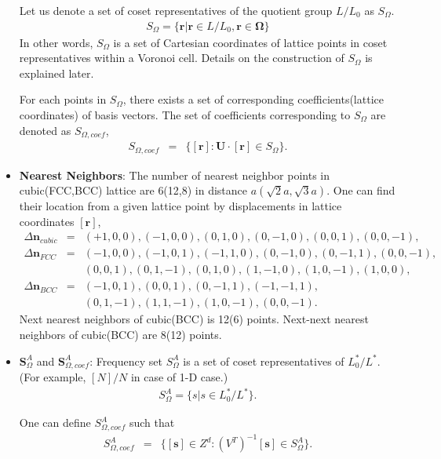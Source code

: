 \documentclass[10pt]{book}
\def\bm{\boldsymbol}
\newcommand{\bea}{\begin{eqnarray}}
\newcommand{\eea}{\end{eqnarray}}
\newcommand{\no}{\nonumber \\}
\def\vn{{\bm n}}
\begin{document}
\begin{itemize}
     Let us denote a set of coset representatives of the quotient group $L/L_0$ as $S_\Omega$.  
     \bea 
     S_\Omega  = \{ {\bm r}| {\bm r}\in L/L_0, {\bm r} \in {\bm \Omega} \}
     \eea 
     In other words, $S_\Omega$ is a set of Cartesian coordinates of lattice points 
     in coset representatives within a Voronoi cell.
     Details on the construction of $S_\Omega$ is explained later.
   
     For each points in $S_\Omega$, there exists a set of corresponding coefficients(lattice coordinates) 
     of basis vectors. The set of coefficients corresponding to $S_\Omega$ are denoted as 
     $S_{\Omega,coef}$,
     \bea 
     S_{\Omega,coef}&=&\{ [{\bm r}] : {\bm U}\cdot[{\bm r}] \in S_\Omega \}.
     \eea   

	\item {\bf Nearest Neighbors}: The number of nearest neighbor points in cubic(FCC,BCC) 
lattice are {\color{red} 6(12,8)} in distance $a(\sqrt{2}a,\sqrt{3}a)$. 
One can find their location from a given lattice point 
by displacements in lattice coordinates $[{\bm r}]$,
\bea 
\Delta \vn_{cubic}&=& (+1,0,0), (-1,0,0), (0,1,0), (0,-1,0),(0,0,1),(0,0,-1),\no  
\Delta \vn_{FCC} &=& (-1,0,0),(-1,0,1),(-1,1,0),(0,-1,0),(0,-1,1),(0,0,-1), \no 
& & (0,0,1),(0,1,-1),(0,1,0),(1,-1,0),(1,0,-1),(1,0,0), \no 
\Delta \vn_{BCC} &=& (-1,0,1),(0,0,1),(0,-1,1),(-1,-1,1),\no 
& & (0,1,-1),(1,1,-1),(1,0,-1),(0,0,-1) . 
\eea 
Next nearest neighbors of cubic(BCC) is 12(6) points.
Next-next nearest neighbors of cubic(BCC) are 8(12) points. 

     
   \item ${\bm S}^A_{\Omega}$ and ${\bm S}^A_{\Omega,coef}$: 
      Frequency set $S^A_{\Omega}$ is a set of coset representatives of 
     $L^*_0/L^*$.(For example, $[N]/N$ in case of 1-D case.)
     \bea 
     S^A_{\Omega}=\{s | s\in  L^*_0/L^* \}.
     \eea 
     
     One can define $S^A_{\Omega,coef}$ such that 
     \bea      
     S^A_{\Omega,coef} &=& \{ [{\bm s}]\in Z^d : (V^T)^{-1}[{\bm s}] \in S^A_\Omega  \}.
     \eea 


\end{itemize}
\end{document}
